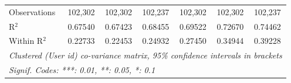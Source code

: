 \begin{table}[htbp]
\begin{threeparttable}[b]
\begin{tabular}{lcccccc}
         Observations               & 102,302            & 102,302            & 102,237            & 102,302              & 102,302              & 102,237\\  
         R$^2$                      & 0.67540            & 0.67423            & 0.68455            & 0.69522              & 0.72670              & 0.74462\\  
         Within R$^2$               & 0.22733            & 0.22453            & 0.24932            & 0.27450              & 0.34944              & 0.39228\\  
         \midrule \midrule
         \multicolumn{7}{l}{\emph{Clustered (User id) co-variance matrix, 95\% confidence intervals in brackets}}\\
         \multicolumn{7}{l}{\emph{Signif. Codes: ***: 0.01, **: 0.05, *: 0.1}}\\
      \end{tabular}
   \end{threeparttable}
\end{table}


